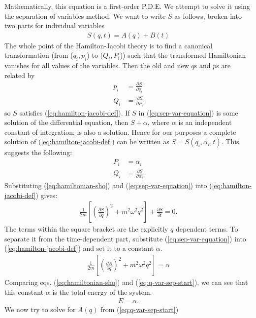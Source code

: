 \begin{enumerate}
Mathematically, this equation is a first-order P.D.E. We attempt to solve it using the separation of variables method. We want to write $S$ as follows, broken into two parts for individual variables
\begin{align}
    S(q, t) = A(q) + B(t)\label{eq:sep-var-equation}
\end{align}
The whole point of the Hamilton-Jacobi theory is to find a canonical transformation (from ($q_i,p_i$) to ($Q_i, P_i$)) such that the transformed Hamiltonian vanishes for all values of the variables. Then the old and new $q$s and $p$s are related by
\begin{align}
    p_i&=\frac{\partial S}{\partial q_i}\\
    Q_i&=\frac{\partial S}{\partial P_i}
\end{align}
so $S$ satisfies (\ref{eq:hamilton-jacobi-def}). If $S$ in (\ref{eq:sep-var-equation}) is some solution of the differential equation, then $S+\alpha$, where $\alpha$ is an independent constant of integration, is also a solution. Hence for our purposes a complete solution of (\ref{eq:hamilton-jacobi-def}) can be written as $S=S(q_i,\alpha_i,t)$. This suggests the following:
\begin{align}
    P_i&=\alpha_i\label{eq:new-p-def}\\
    Q_i&=\frac{\partial S}{\partial \alpha_i}\label{eq:new-q-def}
\end{align}
Substituting (\ref{eq:hamiltonian-sho}) and (\ref{eq:sep-var-equation}) into (\ref{eq:hamilton-jacobi-def}) gives:
\begin{align*}
    \frac{1}{2m}\left[\left(\frac{\partial S}{\partial q}\right)^2+m^2\omega^2q^2\right] + \frac{\partial S}{\partial t} = 0.
\end{align*}
The terms within the square bracket are the explicitly $q$ dependent terms. To separate it from the time-dependent part, substitute (\ref{eq:sep-var-equation}) into (\ref{eq:hamilton-jacobi-def}) and set it to a constant $\alpha$.
\begin{align}
    \frac{1}{2m}\left[\left(\frac{\partial A}{\partial q}\right)^2+m^2\omega^2q^2\right]=\alpha\label{eq:q-var-sep-start}
\end{align}
Comparing eqs. (\ref{eq:hamiltonian-sho}) and (\ref{eq:q-var-sep-start}), we can see that this constant $\alpha$ is the total energy of the system.
\begin{align}
    E = \alpha.
\end{align}
We now try to solve for $A(q)$ from (\ref{eq:q-var-sep-start})

\end{enumerate}
